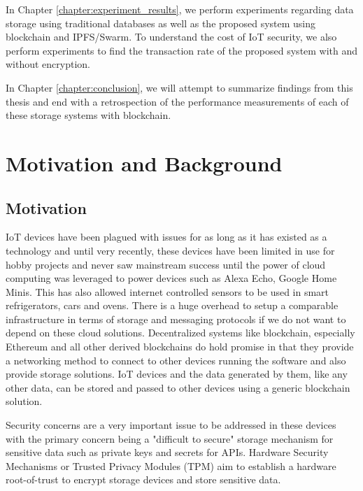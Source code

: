 \documentclass[11pt,openright]{report}
\begin{document}
\noindent In Chapter \ref{chapter:experiment_results}, we perform experiments regarding data storage using traditional databases as well as the proposed system using blockchain and IPFS/Swarm. To understand the cost of IoT security, we also perform experiments to find the transaction rate of the proposed system with and without encryption.\newline

\noindent In Chapter \ref{chapter:conclusion}, we will attempt to summarize findings from this thesis and end with a retrospection of the performance measurements of each of these storage systems with blockchain.\newline 



\chapter{Motivation and Background} \label{chapter:background}
\section{Motivation}\label{section:motivation}
IoT devices have been plagued with issues for as long as it has existed as a technology and until very recently, these devices have been limited in use for hobby projects and never saw mainstream success until the power of cloud computing was leveraged to power devices such as Alexa Echo, Google Home Minis. This has also allowed internet controlled sensors to be used in smart refrigerators, cars and ovens. There is a huge overhead to setup a comparable infrastructure in terms of storage and messaging protocols if we do not want to depend on these cloud solutions. Decentralized systems like blockchain, especially Ethereum and all other derived blockchains do hold promise in that they provide a networking method to connect to other devices running the software and also provide storage solutions. IoT devices and the data generated by them, like any other data, can be stored and passed to other devices using a generic blockchain solution.

Security concerns are a very important issue to be addressed in these devices with the primary concern being a "difficult to secure" storage mechanism for sensitive data such as private keys and secrets for APIs. Hardware Security Mechanisms or Trusted Privacy Modules (TPM) aim to establish a hardware root-of-trust to encrypt storage devices and store sensitive data.
\end{document}
